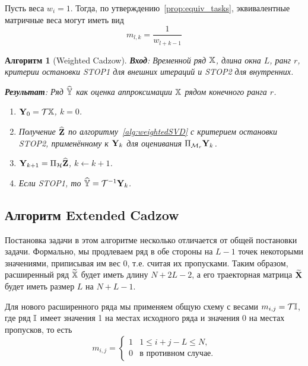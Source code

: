 \documentclass[12pt,a4paper,fleqn,leqno]{article}
\newtheorem{algorithm}{Алгоритм}%
\begin{document}
Пусть веса $w_{i}=1$. Тогда, по утверждению~\ref{prop:equiv_tasks}, эквивалентные матричные веса могут иметь вид 
\begin{equation} 
\label{Mw}
   m_{l, k} = \frac{1}{w_{l + k - 1}}
\end{equation}

\begin{algorithm}[Weighted Cadzow]
\textbf{Вход}: Временной ряд $\mathbb{X}$, длина окна $L$, ранг $r$,
критерии остановки STOP1 для внешних итераций и STOP2 для внутренних.

\textbf{Результат}:
Ряд $\widehat{\mathbb{Y}}$ как оценка аппроксимации $\mathbb{X}$ рядом конечного ранга $r$.

\begin{enumerate}
\item
$\mathbf{Y}_0 = \mathcal{T} \mathbb{X}$, $k=0$.
\item
Получение $\widehat{\mathbf{Z}}$ по алгоритму~\ref{alg:weightedSVD} с критерием остановки STOP2, применённому к $\mathbf{Y}_k$ для оценивания $\Pi_{\mathcal{M}_r} \mathbf{Y}_{k}$.
\item
$\mathbf{Y}_{k+1} = \Pi_{\mathcal{H}}  \widehat{\mathbf{Z}}$, $k\leftarrow k+1$.
\item
Если STOP1, то $\widehat{\mathbb{Y}} = \mathcal{T}^{-1} \mathbf{Y}_k$.
\end{enumerate}
\end{algorithm}

\subsection{Алгоритм Extended Cadzow}

Постановка задачи в этом алгоритме несколько отличается от общей постановки задачи.
Формально, мы продлеваем ряд в обе стороны на $L-1$ точек некоторыми значениями, приписывая им вес 0, т.е.
считая их пропусками. Таким образом, расширенный ряд $\widetilde{\mathbb{X}}$ будет иметь длину $N+2L-2$, а его траекторная матрица
$\widetilde{\mathbf{X}}$ будет иметь размер $L$ на $N+L-1$.

Для нового расширенного ряда мы применяем общую схему с весами $m_{i,j}=\mathcal{T} \mathbb{I}$, где ряд $\mathbb{I}$ имеет 
значения 1 на местах исходного ряда и значения 0 на местах пропусков, то есть
\begin{equation*}
m_{i,j} = \begin{cases}
1 & 1 \le i+j-L \le N, \\
0 & \text{в противном случае.}
\end{cases}
\end{equation*}
\end{document}
